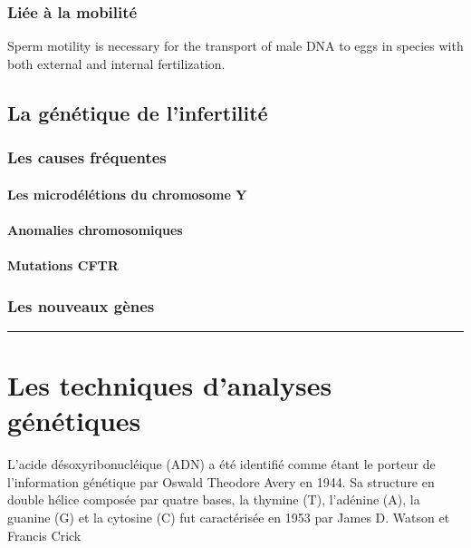 \documentclass[12pt,twoside]{reedthesis}
\theoremstyle{definition}
\theoremstyle{definition}
\theoremstyle{remark}
\begin{document}
  \subsubsection{Liée à la mobilité}\label{liee-a-la-mobilite}
  
  Sperm motility is necessary for the transport of male DNA to eggs in
  species with both external and internal fertilization.
  
  \subsection{La génétique de
  l'infertilité}\label{la-genetique-de-linfertilite}
  
  \subsubsection{Les causes fréquentes}\label{les-causes-frequentes}
  
  \paragraph{Les microdélétions du chromosome
  Y}\label{les-microdeletions-du-chromosome-y}
  
  \paragraph{Anomalies chromosomiques}\label{anomalies-chromosomiques}
  
  \paragraph{Mutations CFTR}\label{mutations-cftr}
  
  \subsubsection{Les nouveaux gènes}\label{les-nouveaux-genes}
  
  \begin{center}\rule{0.5\linewidth}{\linethickness}\end{center}
  
  \section{Les techniques d'analyses
  génétiques}\label{les-techniques-danalyses-genetiques}
  
  L'acide désoxyribonucléique (ADN) a été identifié comme étant le porteur
  de l'information génétique par Oswald Theodore Avery en 1944. Sa
  structure en double hélice composée par quatre bases, la thymine (T),
  l'adénine (A), la guanine (G) et la cytosine (C) fut caractérisée en
  1953 par James D. Watson et Francis Crick
  
\end{document}
